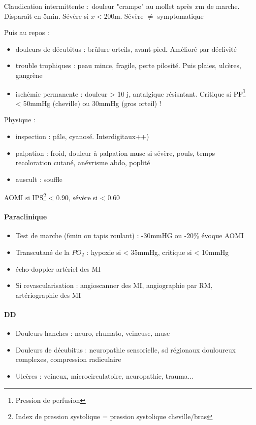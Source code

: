 Claudication intermittente : douleur "crampe" au mollet après $x$m de marche.
Disparaît en 5min. Sévère si $x < 200$m. \danger{} Sévère $\neq$ symptomatique

Puis au repos : 
\begin{itemize}
  \item douleurs de décubitus : brûlure orteils, avant-pied. Amélioré par
    déclivité
  \item trouble trophiques : peau mince, fragile, perte pilosité. Puis plaies,
    ulcères, gangrène
  \item ischémie permanente : douleur > 10 j, antalgique résisntant. Critique si
    PF\footnote{Pression de perfusion} < 50mmHg (cheville) ou 30mmHg (gros
    orteil) !
\end{itemize}
Physique : 
\begin{itemize}
  \item inspection : pâle, cyanosé. Interdigitaux++)
  \item palpation : froid, douleur à palpation musc si sévère, pouls, temps recoloration cutané, anévrisme
abdo, poplité
  \item auscult : souffle
\end{itemize}
AOMI si IPS\footnote{Index de pression systolique = pression systolique
cheville/bras} < 0.90, sévére si < 0.60

\paragraph{Paraclinique}
\begin{itemize}
  \item Test de marche (6min ou tapis roulant) : -30mmHG ou -20\% évoque AOMI
  \item Transcutané de la $PO_2$ : hypoxie si < 35mmHg, critique si < 10mmHg
  \item écho-doppler artériel des MI
  \item Si revascularisation : angioscanner des MI, angiographie par RM,
    artériographie des MI
\end{itemize}

\paragraph{DD} 
\begin{itemize}
  \item Douleurs hanches : neuro, rhumato, veineuse, musc
  \item Douleurs de décubitus : neuropathie sensorielle, sd régionaux douloureux
    complexes, compression radiculaire
  \item Ulcères : veineux, microcirculatoire, neuropathie, trauma...
\end{itemize}

